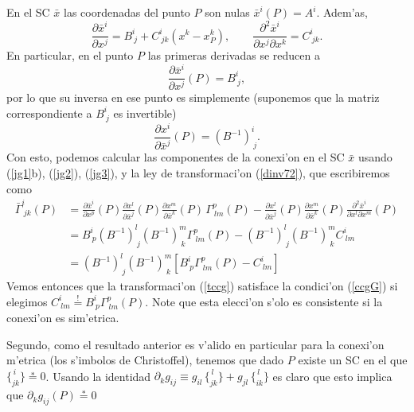 En el SC $\bar{x}$ las coordenadas del punto $P$ son nulas $\bar{x}^i(P)=A^i$. Adem'as,
\begin{equation}
\frac{\partial\bar{x}^i}{\partial x^j}=B^i_{\ j}+C^i_{\ jk}(x^k-x^k_P), \qquad \frac{\partial^2\bar{x}^i}{\partial x^j\partial x^k}=C^i_{\ jk}. \label{jg1}
\end{equation}
En particular, en el punto $P$ las primeras derivadas se reducen a
\begin{equation}\label{jg2}
\frac{\partial\bar{x}^i}{\partial x^j}(P)=B^i_{\ j},
\end{equation}
por lo que su inversa en ese punto es simplemente (suponemos que la matriz correspondiente a $B^i_{\ j}$ es invertible)
\begin{equation}\label{jg3}
\frac{\partial x^i}{\partial \bar{x}^j}(P)=(B^{-1})^i_{\ j}.
\end{equation}
Con esto, podemos calcular las componentes de la conexi'on en el SC $\bar{x}$ usando (\ref{jg1}b), (\ref{jg2}), (\ref{jg3}), y la ley de transformaci'on (\ref{dinv72}), que escribiremos como
\begin{align}
\bar{\Gamma}_{\ jk}^i(P) &= \frac{\partial\bar{x}^i}{\partial x^p }(P)\frac{\partial
x^l}{\partial\bar{x}^j }(P)\frac{\partial x^m}{\partial\bar{x}^k }(P)\,
\Gamma_{\ lm}^p(P) -\frac{\partial x^l}{\partial \bar{x}^j}(P)\frac{\partial x^m}{\partial \bar{x}^k}(P)\frac{\partial^2\bar{x}^i}{\partial x^l \partial x^m }(P) \\
&= B^i_{\ p}(B^{-1})^l_{\ j}(B^{-1})^m_{\ k}\Gamma^p_{\ lm}(P)-(B^{-1})^l_{\ j}(B^{-1})^m_{\ k}C^i_{\ lm} \\
&= (B^{-1})^l_{\ j}(B^{-1})^m_{\ k}\left[B^i_{\ p}\Gamma^p_{\ lm}(P)-C^i_{\ lm}\right]
\end{align}
Vemos entonces que la transformaci'on (\ref{tccg}) satisface la condici'on (\ref{ccgG}) si elegimos $C^i_{\ lm}\stackrel{!}{=}B^i_{\ p}\Gamma^p_{\ lm}(P)$. Note que esta elecci'on s'olo es consistente si la conexi'on es sim'etrica.

Segundo, como el resultado anterior es v'alido en particular para la conexi'on m'etrica (los s'imbolos de Christoffel), tenemos que dado $P$ existe un SC en el que $\{^{\,i}_{jk}\}\stackrel{*}{=}0$. Usando la identidad $\partial_kg_{ij}\equiv g_{il}\,\{ ^{\, l} _{jk}\}+g_{jl}\,\{ ^{\, l} _{ik}\}$ es claro que esto implica que $\partial_kg_{ij}(P)\stackrel{*}{=}0$

